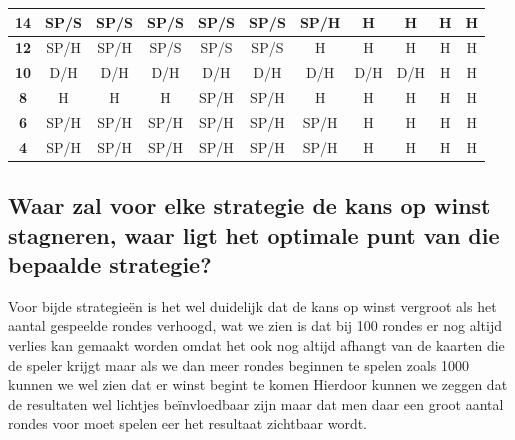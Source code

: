 \documentclass[conference]{IEEEtran}
\begin{document}
\begin{table}[htbp]
\begin{tabular}{|c|c|c|c|c|c|c|c|c|c|c|}
\textbf{14} & \cellcolor[HTML]{F8FF00}SP/S & \cellcolor[HTML]{F8FF00}SP/S & \cellcolor[HTML]{F8FF00}SP/S & \cellcolor[HTML]{F8FF00}SP/S & \cellcolor[HTML]{F8FF00}SP/S & \cellcolor[HTML]{F8FF00}SP/H & \cellcolor[HTML]{FE0000}H & \cellcolor[HTML]{FE0000}H & \cellcolor[HTML]{FE0000}H & \cellcolor[HTML]{FE0000}H \\ \hline
\textbf{12} & \cellcolor[HTML]{F8FF00}SP/H & \cellcolor[HTML]{F8FF00}SP/H & \cellcolor[HTML]{F8FF00}SP/S & \cellcolor[HTML]{F8FF00}SP/S & \cellcolor[HTML]{F8FF00}SP/S & \cellcolor[HTML]{FE0000}H & \cellcolor[HTML]{FE0000}H & \cellcolor[HTML]{FE0000}H & \cellcolor[HTML]{FE0000}H & \cellcolor[HTML]{FE0000}H \\ \hline
\textbf{10} & \cellcolor[HTML]{FFC702}D/H & \cellcolor[HTML]{FFC702}D/H & \cellcolor[HTML]{FFC702}D/H & \cellcolor[HTML]{FFC702}D/H & \cellcolor[HTML]{FFC702}D/H & \cellcolor[HTML]{FFC702}D/H & \cellcolor[HTML]{FFC702}D/H & \cellcolor[HTML]{FFC702}D/H & \cellcolor[HTML]{FE0000}H & \cellcolor[HTML]{FE0000}H \\ \hline
\textbf{8} & \cellcolor[HTML]{FE0000}H & \cellcolor[HTML]{FE0000}H & \cellcolor[HTML]{FE0000}H & \cellcolor[HTML]{F8FF00}SP/H & \cellcolor[HTML]{F8FF00}SP/H & \cellcolor[HTML]{FE0000}H & \cellcolor[HTML]{FE0000}H & \cellcolor[HTML]{FE0000}H & \cellcolor[HTML]{FE0000}H & \cellcolor[HTML]{FE0000}H \\ \hline
\textbf{6} & \cellcolor[HTML]{F8FF00}SP/H & \cellcolor[HTML]{F8FF00}SP/H & \cellcolor[HTML]{F8FF00}SP/H & \cellcolor[HTML]{F8FF00}SP/H & \cellcolor[HTML]{F8FF00}SP/H & \cellcolor[HTML]{F8FF00}SP/H & \cellcolor[HTML]{FE0000}H & \cellcolor[HTML]{FE0000}H & \cellcolor[HTML]{FE0000}H & \cellcolor[HTML]{FE0000}H \\ \hline
\textbf{4} & \cellcolor[HTML]{F8FF00}SP/H & \cellcolor[HTML]{F8FF00}SP/H & \cellcolor[HTML]{F8FF00}SP/H & \cellcolor[HTML]{F8FF00}SP/H & \cellcolor[HTML]{F8FF00}SP/H & \cellcolor[HTML]{F8FF00}SP/H & \cellcolor[HTML]{FE0000}H & \cellcolor[HTML]{FE0000}H & \cellcolor[HTML]{FE0000}H & \cellcolor[HTML]{FE0000}H \\ \hline
\end{tabular}
\end{table}


\subsection{ Waar zal voor elke strategie de kans op winst stagneren, waar ligt het optimale punt van die bepaalde strategie?}
Voor bijde strategieën is het wel duidelijk dat de kans op winst vergroot als het aantal gespeelde rondes verhoogd, wat we zien is dat bij 100 rondes er nog altijd verlies kan gemaakt worden omdat het ook nog altijd afhangt van de kaarten die de speler krijgt maar als we dan meer rondes beginnen te spelen zoals 1000 kunnen we wel zien dat er winst begint te komen Hierdoor kunnen we zeggen dat de resultaten wel lichtjes beïnvloedbaar zijn maar dat men daar een groot aantal rondes voor moet spelen eer het resultaat zichtbaar wordt. 
\end{document}

